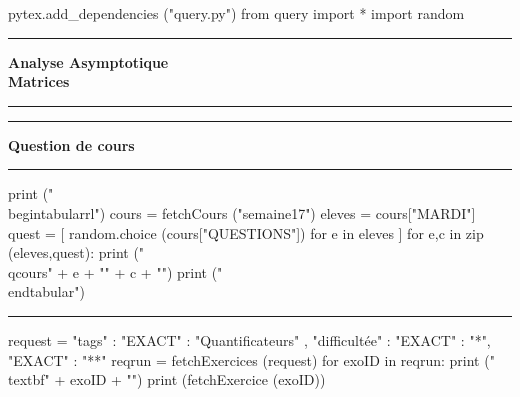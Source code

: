 \documentclass[11pt]{article}
\newcounter{exo}
\newcommand{\qcours}[2]{\textbf{#1} & #2 \\}
\begin{document}
    \begin{pycode}
pytex.add_dependencies ("query.py")
from query import *
import random
    \end{pycode}


\begin{center}
\rule{15em}{2pt}


\vspace{1em}
\textbf{\huge{Analyse Asymptotique \\ Matrices}}
\vspace{0.5em}


\rule{15em}{2pt}
\end{center}



    \begin{center}
        \rule[0.23em]{1.5em}{1pt} 
        \textbf{Question de cours}
        \rule[0.23em]{24em}{1pt}
    \end{center}
    

\begin{center}
\begin{minipage}{0.8\linewidth}
    \begin{pycode}
print ("\\begin{tabular}{rl}")
cours  = fetchCours ("semaine17")
eleves = cours["MARDI"]
quest  = [ random.choice (cours["QUESTIONS"]) for e in eleves ] 
for e,c in zip (eleves,quest):
    print ("\\qcours{" + e + "}{" + c +  "}")
print ("\\end{tabular}")
    \end{pycode}
\end{minipage}
\end{center}

    \begin{center}
        \rule{35em}{1pt}
    \end{center}

    \begin{pycode}
request   = {
    "tags" : { 
        "EXACT" : "Quantificateurs"
    },
    "difficultée" : {
        "EXACT" : "*",
        "EXACT" : "**"
    }
}
reqrun    = fetchExercices (request)
for exoID in reqrun:
    print ("\\textbf{" + exoID + "}")
    print (fetchExercice (exoID))
    \end{pycode}
\end{document}

